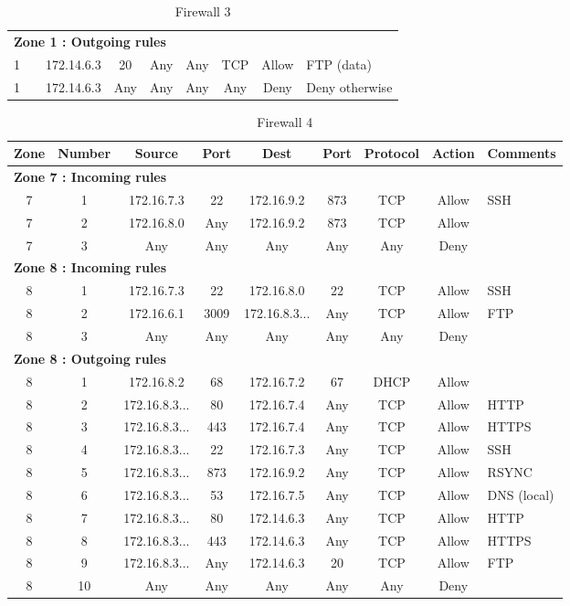 \documentclass[a4paper,titlepage]{article}
\begin{document}
\begin{landscape}
\begin{table}[h]
\begin{tabular}{c|c|cc|cc|ccl}
			\hline
			\multicolumn{9}{l}{\textbf{Zone 1 : Outgoing rules}}\\
			1 &  & 172.14.6.3 & 20 & Any & Any & TCP & Allow & FTP (data)\\
			1 &  & 172.14.6.3 & Any & Any & Any & Any & Deny & Deny otherwise\\
		\end{tabular}
		\caption{Firewall 3}
	\end{table}
	\vspace*{\fill}
\end{landscape}




\begin{table}[h]
	\center
	\begin{tabular}{c|c|cc|cc|ccl}
		Zone & Number & Source & Port & Dest & Port & Protocol & Action & \multicolumn{1}{c}{Comments}\\
		\hline
		\multicolumn{9}{l}{\textbf{Zone 7 : Incoming rules}}\\
		7 & 1 & 172.16.7.3 & 22 & 172.16.9.2 & 873 & TCP & Allow & SSH\\
		7 & 2 & 172.16.8.0 & Any & 172.16.9.2 & 873 & TCP & Allow & \\
		7 & 3 & Any & Any & Any & Any & Any & Deny & \\

		\hline
		\multicolumn{9}{l}{\textbf{Zone 8 : Incoming rules}}\\
		8 & 1 & 172.16.7.3 & 22 & 172.16.8.0 & 22 & TCP & Allow & SSH \\
		8 & 2 & 172.16.6.1 & 3009 & 172.16.8.3... & Any & TCP & Allow & FTP \\
		8 & 3 & Any & Any & Any & Any & Any & Deny & \\
		\hline
		\multicolumn{9}{l}{\textbf{Zone 8 : Outgoing rules}}\\
		8 & 1 & 172.16.8.2 & 68 & 172.16.7.2 & 67 & DHCP & Allow & \\
		8 & 2 & 172.16.8.3... & 80 & 172.16.7.4 & Any & TCP & Allow & HTTP \\
		8 & 3 & 172.16.8.3... & 443 & 172.16.7.4 & Any & TCP & Allow & HTTPS \\
		8 & 4 & 172.16.8.3... & 22 & 172.16.7.3 & Any & TCP & Allow & SSH \\
		8 & 5 & 172.16.8.3... & 873 & 172.16.9.2 & Any & TCP & Allow & RSYNC \\
		8 & 6 & 172.16.8.3... & 53 & 172.16.7.5 & Any & TCP & Allow & DNS (local) \\
		8 & 7 & 172.16.8.3... & 80 & 172.14.6.3 & Any & TCP & Allow & HTTP \\
		8 & 8 & 172.16.8.3... & 443 & 172.14.6.3 & Any & TCP & Allow & HTTPS \\
		8 & 9 & 172.16.8.3... & Any & 172.14.6.3 & 20 & TCP & Allow & FTP \\
		8 & 10 & Any & Any & Any & Any & Any & Deny & \\
		\hline

	\end{tabular}
	\caption{Firewall 4}
\end{table}
\end{document}
